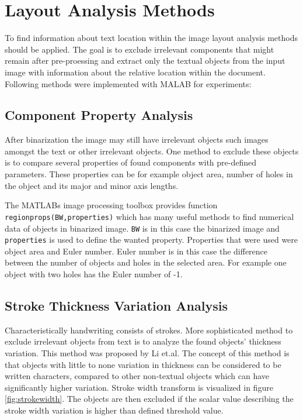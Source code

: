 \documentclass{article}
\def\code#1{\texttt{#1}}
\begin{document}
    \newpage
    \section{Layout Analysis Methods}
      To find information about text location within the image layout analysis methods should be applied. The goal is to exclude irrelevant components that might remain after pre-proessing and extract only the textual objects from the input image with information about the relative location within the document. Following methods were implemented with MALAB for experiments:



        \subsection{Component Property Analysis}
          After binarization the image may still have irrelevant objects such images amongst the text or other irrelevant objects. One method to exclude these objects is to compare several properties of found components with pre-defined parameters. These properties can be for example object area, number of holes in the object and its major and minor axis lengths.

          The MATLABs image processing toolbox  provides function \code{regionprops(BW,properties)} which has many useful methods to find numerical data of objects in binarized image. \code{BW} is in this case the binarized image and \code{properties} is used to define the wanted property. Properties that were used were object area and Euler number. Euler number is in this case the difference between the number of objects and holes in the selected area. For example one object with two holes has the Euler number of -1.

        \subsection{Stroke Thickness Variation Analysis}
          Characteristically handwriting consists of strokes. More sophisticated method to exclude irrelevant objects from text is to analyze the found objects' thickness variation. This method was proposed by Li et.al. \cite{Li} The concept of this method is that objects with little to none variation in thickness can be considered to be written characters, compared to other non-textual objects which can have significantly higher variation. Stroke width transform is visualized in figure \ref{fig:strokewidth}. The objects are then excluded if the scalar value describing the stroke width variation is higher than defined threshold value.
\end{document}
